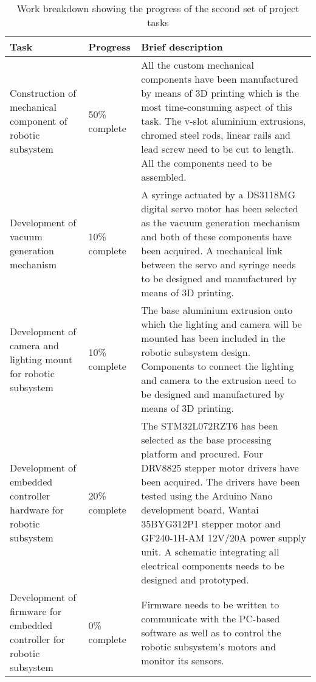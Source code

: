 \begin{table}[ht]
	\centering
\begin{tabular}{|>{\raggedright}p{4.5cm}|>{\raggedright}p{2.8cm}|>{\raggedright\arraybackslash}p{6.8cm}|}
	\hline
	\textbf{Task} & \textbf{Progress} & \textbf{Brief description} \\ \hline
	Construction of mechanical component of robotic subsystem & 50\% complete & All the custom mechanical components have been manufactured by means of 3D printing which is the most time-consuming aspect of this task. The v-slot aluminium extrusions, chromed steel rods, linear rails and lead screw need to be cut to length. All the components need to be assembled. \\ \hline
	Development of vacuum generation mechanism & 10\% complete & A syringe actuated by a DS3118MG digital servo motor has been selected as the vacuum generation mechanism and both of these components have been acquired. A mechanical link between the servo and syringe needs to be designed and manufactured by means of 3D printing. \\ \hline
	Development of camera and lighting mount for robotic subsystem & 10\% complete & The base aluminium extrusion onto which the lighting and camera will be mounted has been included in the robotic subsystem design. Components to connect the lighting and camera to the extrusion need to be designed and manufactured by means of 3D printing. \\ \hline
	Development of embedded controller hardware for robotic subsystem & 20\% complete & The STM32L072RZT6 has been selected as the base processing platform and procured. Four DRV8825 stepper motor drivers have been acquired. The drivers have been tested using the Arduino Nano development board, Wantai 35BYG312P1 stepper motor and GF240-1H-AM 12V/20A power supply unit. A schematic integrating all electrical components needs to be designed and prototyped. \\ \hline
	Development of firmware for embedded controller for robotic subsystem & 0\% complete & Firmware needs to be written to communicate with the PC-based software as well as to control the robotic subsystem's motors and monitor its sensors. \\ \hline
\end{tabular}
	\caption{Work breakdown showing the progress of the second set of project tasks}
\end{table}

